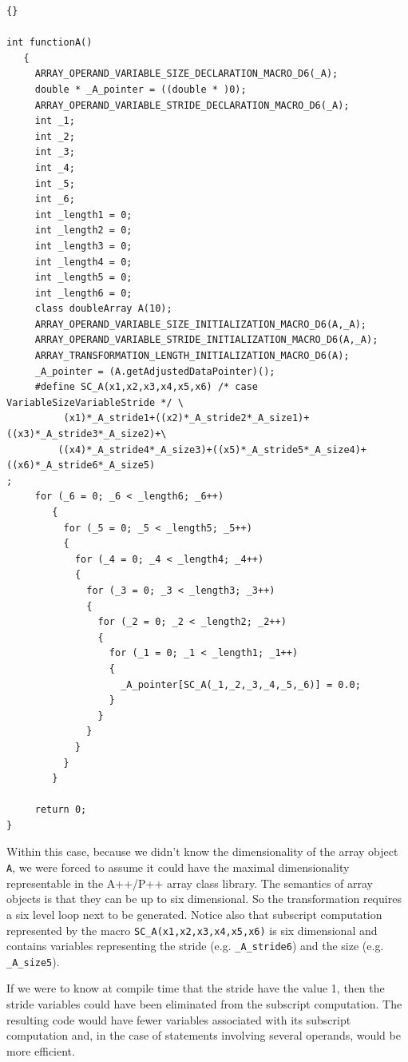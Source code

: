 \documentclass[10pt]{article}
\begin{document}
\begin{lstlisting}{}

int functionA()
   { 
     ARRAY_OPERAND_VARIABLE_SIZE_DECLARATION_MACRO_D6(_A); 
     double * _A_pointer = ((double * )0); 
     ARRAY_OPERAND_VARIABLE_STRIDE_DECLARATION_MACRO_D6(_A); 
     int _1; 
     int _2; 
     int _3; 
     int _4; 
     int _5; 
     int _6; 
     int _length1 = 0; 
     int _length2 = 0; 
     int _length3 = 0; 
     int _length4 = 0; 
     int _length5 = 0; 
     int _length6 = 0;
     class doubleArray A(10);
     ARRAY_OPERAND_VARIABLE_SIZE_INITIALIZATION_MACRO_D6(A,_A); 
     ARRAY_OPERAND_VARIABLE_STRIDE_INITIALIZATION_MACRO_D6(A,_A); 
     ARRAY_TRANSFORMATION_LENGTH_INITIALIZATION_MACRO_D6(A); 
     _A_pointer = (A.getAdjustedDataPointer)(); 
     #define SC_A(x1,x2,x3,x4,x5,x6) /* case VariableSizeVariableStride */ \
          (x1)*_A_stride1+((x2)*_A_stride2*_A_size1)+((x3)*_A_stride3*_A_size2)+\
         ((x4)*_A_stride4*_A_size3)+((x5)*_A_stride5*_A_size4)+((x6)*_A_stride6*_A_size5)
; 
     for (_6 = 0; _6 < _length6; _6++)
        { 
          for (_5 = 0; _5 < _length5; _5++)
          { 
            for (_4 = 0; _4 < _length4; _4++)
            { 
              for (_3 = 0; _3 < _length3; _3++)
              { 
                for (_2 = 0; _2 < _length2; _2++)
                { 
                  for (_1 = 0; _1 < _length1; _1++)
                  { 
                    _A_pointer[SC_A(_1,_2,_3,_4,_5,_6)] = 0.0; 
                  } 
                } 
              } 
            } 
          } 
        } 

     return 0;
} 

\end{lstlisting}

Within this case, because we didn't know the dimensionality of the array object {\tt A}, we were
forced to assume it could have the maximal dimensionality representable in the A++/P++ array class
library.  The semantics of array objects is that they can be up to six dimensional.  So the
transformation requires a six level loop next to be generated.  Notice also that subscript
computation represented by the macro {\tt SC\_A(x1,x2,x3,x4,x5,x6)} is six dimensional and contains
variables representing the stride (e.g. {\tt \_A\_stride6}) and the size (e.g. {\tt \_A\_size5}).

If we were to know at compile time that the stride have the value 1, then the stride variables could
have been eliminated from the subscript computation.  The resulting code would have fewer variables
associated with its subscript computation and, in the case of statements involving several operands,
would be more efficient.
\end{document}
